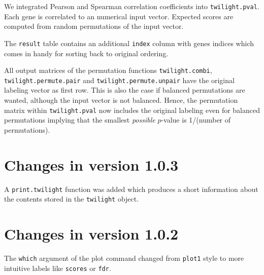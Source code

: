 \documentclass[11pt,a4paper,fleqn]{report}
\newcommand{\Robject}[1]{{\texttt{#1}}}
\newcommand{\Rfunction}[1]{{\texttt{#1}}}
\newcommand{\Rfunarg}[1]{{\texttt{#1}}}
\begin{document}
We integrated Pearson and Spearman correlation coefficients into \Rfunction{twilight.pval}. Each gene is correlated to an numerical input vector. Expected scores are computed from random permutations of the input vector.
       
The \Robject{result} table contains an additional \Robject{index} column with genes indices which comes in handy for sorting back to original ordering.

All output matrices of the permutation functions \Rfunction{twilight.combi}, \Rfunction{twilight.permute.pair} and \Rfunction{twilight.permute.unpair} have the original labeling vector as first row. This is also the case if balanced permutations are wanted, although the input vector is not balanced. Hence, the permutation matrix within \Rfunction{twilight.pval} now includes the original labeling even for balanced permutations implying that the smallest \textit{possible} $p$-value is 1/(number of permutations).


\section{Changes in version 1.0.3}

A \Rfunction{print.twilight} function was added which produces a short information about the contents stored in the \Robject{twilight} object.


\section{Changes in version 1.0.2}

The \Rfunarg{which} argument of the plot command changed from \Rfunction{plot1} style to more intuitive labels like \Rfunarg{scores} or \Rfunarg{fdr}.

       
\end{document}
